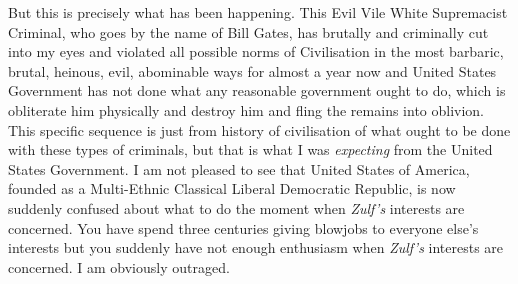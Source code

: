 \documentclass{amsart}
\begin{document}
But this is precisely what has been happening.  This Evil Vile White Supremacist Criminal, who goes by the name of Bill Gates, has brutally and criminally cut into my eyes and violated all possible norms of Civilisation in the most barbaric, brutal, heinous, evil, abominable ways for almost a year now and United States Government has not done what any reasonable government ought to do, which is obliterate him physically and destroy him and fling the remains into oblivion.  This specific sequence is just from history of civilisation of what ought to be done with these types of criminals, but that is what I was {\em expecting} from the United States Government.  I am not pleased to see that United States of America, founded as a Multi-Ethnic Classical Liberal Democratic Republic, is now suddenly confused about what to do the moment when {\em Zulf's} interests are concerned.  You have spend three centuries giving blowjobs to everyone else's interests but you suddenly have not enough enthusiasm when {\em Zulf's} interests are concerned.  I am obviously outraged.  
\end{document}
